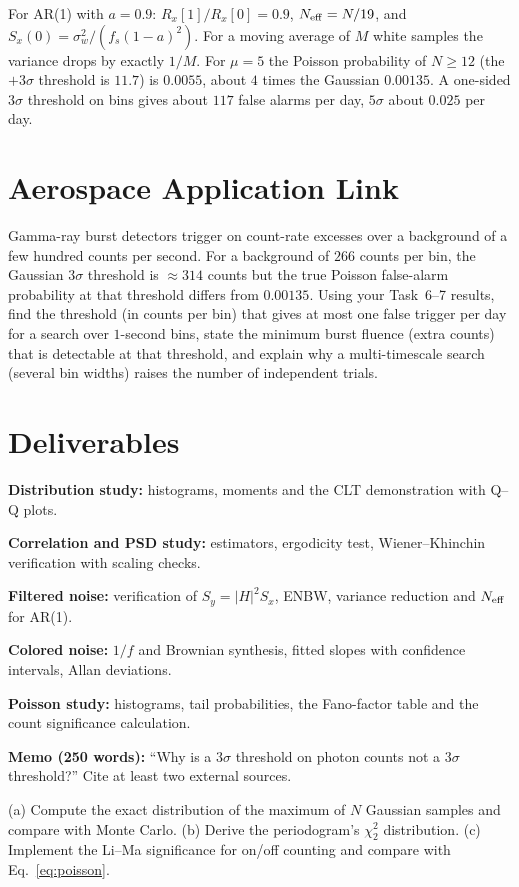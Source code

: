\documentclass[11pt,a4paper]{article}
\begin{document}
\begin{checkpoint}
For AR(1) with $a=0.9$: $R_x[1]/R_x[0]=0.9$, $N_{\rm eff}=N/19$, and $S_x(0)=\sigma_w^2/(f_s(1-a)^2)$. For a moving average of $M$ white samples the variance drops by exactly $1/M$. For $\mu=5$ the Poisson probability of $N\ge12$ (the $+3\sigma$ threshold is $11.7$) is $0.0055$, about $4$ times the Gaussian $0.00135$. A one-sided $3\sigma$ threshold on  bins gives about $117$ false alarms per day, $5\sigma$ about $0.025$ per day.
\end{checkpoint}

\section*{Aerospace Application Link}
Gamma-ray burst detectors trigger on count-rate excesses over a background of a few hundred counts per second. For a background of $266$ counts per  bin, the Gaussian $3\sigma$ threshold is $\approx314$ counts but the true Poisson false-alarm probability at that threshold differs from $0.00135$. Using your Task~6--7 results, find the threshold (in counts per bin) that gives at most one false trigger per day for a search over $1$-second bins, state the minimum burst fluence (extra counts) that is detectable at that threshold, and explain why a multi-timescale search (several bin widths) raises the number of independent trials.

\section*{Deliverables}
\begin{delivs}
  \item[D1] \textbf{Distribution study:} histograms, moments and the CLT demonstration with Q--Q plots.
  \item[D2] \textbf{Correlation and PSD study:} estimators, ergodicity test, Wiener--Khinchin verification with scaling checks.
  \item[D3] \textbf{Filtered noise:} verification of $S_y=|H|^2S_x$, ENBW, variance reduction and $N_{\rm eff}$ for AR(1).
  \item[D4] \textbf{Colored noise:} $1/f$ and Brownian synthesis, fitted slopes with confidence intervals, Allan deviations.
  \item[D5] \textbf{Poisson study:} histograms, tail probabilities, the Fano-factor table and the count significance calculation.
  \item[D6] \textbf{Memo (250 words):} ``Why is a $3\sigma$ threshold on photon counts not a $3\sigma$ threshold?'' Cite at least two external sources.
  \item[Bonus] (a) Compute the exact distribution of the maximum of $N$ Gaussian samples and compare with Monte Carlo. (b) Derive the periodogram's $\chi^2_2$ distribution. (c) Implement the Li--Ma significance for on/off counting and compare with Eq.~\eqref{eq:poisson}.
\end{delivs}
\end{document}
